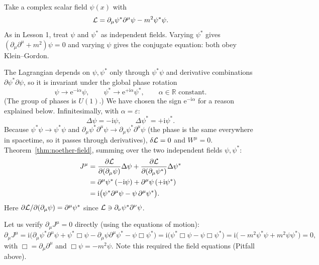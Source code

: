 \documentclass[11pt]{article}
\newcommand{\eps}{\varepsilon}
\begin{document}
Take a complex scalar field $\psi(x)$ with
\begin{equation}
  \mathcal{L}=\partial_\mu\psi^*\partial^\mu\psi-m^2\psi^*\psi .
  \label{eq:Lcomplex}
\end{equation}
As in Lesson 1, treat $\psi$ and $\psi^*$ as independent fields. Varying $\psi^*$ gives $(\partial_\mu\partial^\mu+m^2)\psi=0$ and varying $\psi$ gives the conjugate equation: both obey Klein--Gordon.

The Lagrangian depends on $\psi,\psi^*$ only through $\psi^*\psi$ and derivative combinations $\partial\psi^*\partial\psi$, so it is invariant under the global phase rotation
\begin{equation}
  \psi\to\mathrm e^{-\mathrm i\alpha}\psi,\qquad \psi^*\to\mathrm e^{+\mathrm i\alpha}\psi^*,\qquad \alpha\in\mathbb R \text{ constant}.
\end{equation}
(The group of phases is $U(1)$.) We have chosen the sign $\mathrm e^{-\mathrm i\alpha}$ for a reason explained below. Infinitesimally, with $\alpha=\eps$:
\begin{equation}
  \Delta\psi=-\mathrm i\psi,\qquad \Delta\psi^*=+\mathrm i\psi^* .
\end{equation}
Because $\psi^*\psi\to\psi^*\psi$ and $\partial_\mu\psi^*\partial^\mu\psi\to\partial_\mu\psi^*\partial^\mu\psi$ (the phase is the same everywhere in spacetime, so it passes through derivatives), $\delta\mathcal{L}=0$ and $W^\mu=0$. Theorem~\ref{thm:noether-field}, summing over the two independent fields $\psi,\psi^*$:
\begin{align}
  J^\mu&=\frac{\partial \mathcal{L}}{\partial (\partial_\mu\psi)}\Delta\psi+\frac{\partial \mathcal{L}}{\partial (\partial_\mu\psi^*)}\Delta\psi^*\notag\\
  &=\partial^\mu\psi^*\,(-\mathrm i\psi)+\partial^\mu\psi\,(+\mathrm i\psi^*)\notag\\
  &=\mathrm i\big(\psi^*\partial^\mu\psi-\psi\,\partial^\mu\psi^*\big).
  \label{eq:Ucurrent}
\end{align}
Here $\partial\mathcal{L}/\partial(\partial_\mu\psi)=\partial^\mu\psi^*$ since $\mathcal{L}\ni\partial_\nu\psi^*\partial^\nu\psi$.

Let us verify $\partial_\mu J^\mu=0$ directly (using the equations of motion):
\begin{equation}
  \partial_\mu J^\mu=\mathrm i\big(\partial_\mu\psi^*\partial^\mu\psi+\psi^*\Box\psi-\partial_\mu\psi\partial^\mu\psi^*-\psi\Box\psi^*\big)
  =\mathrm i\big(\psi^*\Box\psi-\psi\Box\psi^*\big)=\mathrm i\big(-m^2\psi^*\psi+m^2\psi\psi^*\big)=0 ,
\end{equation}
with $\Box=\partial_\mu\partial^\mu$ and $\Box\psi=-m^2\psi$. Note this required the field equations (Pitfall above).
\end{document}
